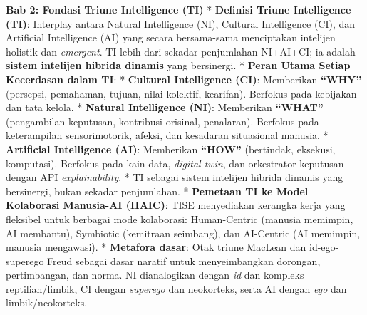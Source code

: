 \documentclass[
  letterpaper,
  DIV=11,
  numbers=noendperiod]{scrreprt}
\begin{document}
\textbf{Bab 2: Fondasi Triune Intelligence (TI)} * \textbf{Definisi
Triune Intelligence (TI)}: Interplay antara Natural Intelligence (NI),
Cultural Intelligence (CI), dan Artificial Intelligence (AI) yang secara
bersama-sama menciptakan intelijen holistik dan \emph{emergent}. TI
lebih dari sekadar penjumlahan NI+AI+CI; ia adalah \textbf{sistem
intelijen hibrida dinamis} yang bersinergi. * \textbf{Peran Utama Setiap
Kecerdasan dalam TI}: * \textbf{Cultural Intelligence (CI)}: Memberikan
\textbf{``WHY''} (persepsi, pemahaman, tujuan, nilai kolektif,
kearifan). Berfokus pada kebijakan dan tata kelola. * \textbf{Natural
Intelligence (NI)}: Memberikan \textbf{``WHAT''} (pengambilan keputusan,
kontribusi orisinal, penalaran). Berfokus pada keterampilan
sensorimotorik, afeksi, dan kesadaran situasional manusia. *
\textbf{Artificial Intelligence (AI)}: Memberikan \textbf{``HOW''}
(bertindak, eksekusi, komputasi). Berfokus pada kain data, \emph{digital
twin}, dan orkestrator keputusan dengan API \emph{explainability}. * TI
sebagai sistem intelijen hibrida dinamis yang bersinergi, bukan sekadar
penjumlahan. * \textbf{Pemetaan TI ke Model Kolaborasi Manusia-AI
(HAIC)}: TISE menyediakan kerangka kerja yang fleksibel untuk berbagai
mode kolaborasi: Human-Centric (manusia memimpin, AI membantu),
Symbiotic (kemitraan seimbang), dan AI-Centric (AI memimpin, manusia
mengawasi). * \textbf{Metafora dasar}: Otak triune MacLean dan
id-ego-superego Freud sebagai dasar naratif untuk menyeimbangkan
dorongan, pertimbangan, dan norma. NI dianalogikan dengan \emph{id} dan
kompleks reptilian/limbik, CI dengan \emph{superego} dan neokorteks,
serta AI dengan \emph{ego} dan limbik/neokorteks.
\end{document}
